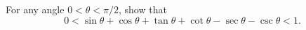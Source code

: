 For any angle $0 < \theta < \pi/2$,  show that\[0 < \sin \theta + \cos \theta + \tan \theta + \cot \theta - \sec \theta - \csc \theta < 1.\]